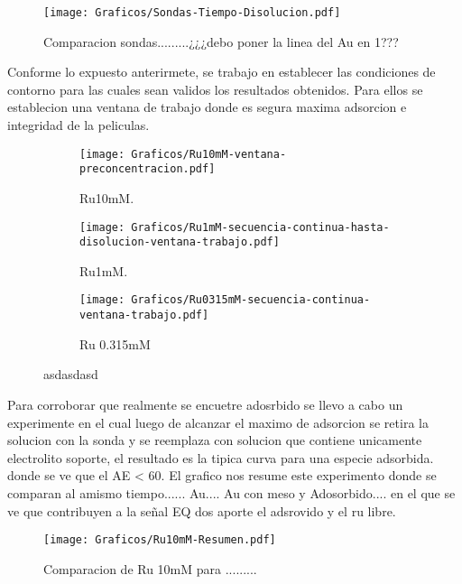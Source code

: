 			\begin{figure}[ht]
				\centering
		 	    \texttt{[image: Graficos/Sondas-Tiempo-Disolucion.pdf]}
		        \caption[AAAAAAaa]{Comparacion sondas.........¿¿¿debo poner la linea del Au en 1???}
		      	\end{figure}

	Conforme lo expuesto anterirmete, se trabajo en establecer las condiciones de contorno para las cuales sean validos los resultados obtenidos. Para ellos se establecion una ventana de trabajo donde es segura maxima adsorcion e integridad de la peliculas.
			
			\begin{figure}[th]
	 	   	    \begin{subfigure}[t]{0.325\textwidth}
		        	\texttt{[image: Graficos/Ru10mM-ventana-preconcentracion.pdf]}
		       		\caption{Ru10mM.}
		         	\label{fig:Ventana_Ru10mM}
		     		\end{subfigure}
	     		\begin{subfigure}[t]{0.325\textwidth}
		        	\texttt{[image: Graficos/Ru1mM-secuencia-continua-hasta-disolucion-ventana-trabajo.pdf]}
		       		\caption{Ru1mM.}
		         	\label{fig:Ventana_Ru1mM}
		     		\end{subfigure}
	     		\begin{subfigure}[t]{0.325\textwidth}
		        	\texttt{[image: Graficos/Ru0315mM-secuencia-continua-ventana-trabajo.pdf]}
		       		\caption{Ru 0.315mM}
		         	\label{fig:Ru_0315mM}
		     		\end{subfigure}
	 	   	   	\caption[asdasdasd]{asdasdasd}
	     		\label{fig:ventana-trabajo}
	     	   	\end{figure}

	Para corroborar que realmente se encuetre adosrbido se llevo a cabo un experimente en el cual luego de alcanzar el maximo de adsorcion se retira la solucion con la sonda y se reemplaza con solucion que contiene unicamente electrolito soporte, el resultado es la tipica curva para una especie adsorbida. donde se ve que el AE < 60. El grafico nos resume este experimento donde se comparan al amismo tiempo...... Au.... Au con meso y Adosorbido.... en el que se ve que contribuyen a la señal EQ dos aporte el adsrovido y el ru libre.

			\begin{figure}[ht]
				\centering
		 	    \texttt{[image: Graficos/Ru10mM-Resumen.pdf]}
		        \caption[asd]{Comparacion de Ru 10mM para .........}
		        \label{fig:asd}
		      	\end{figure}     	   	

